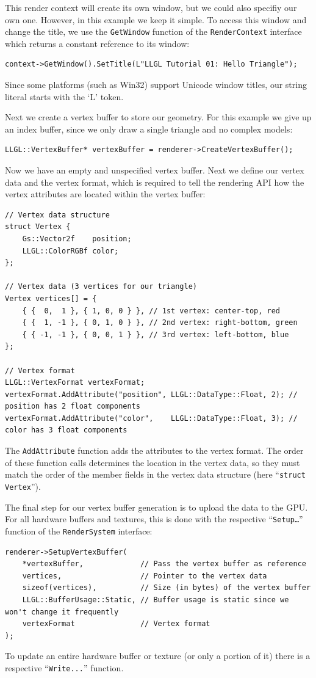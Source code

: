 \documentclass{article}
\begin{document}
This render context will create its own window, but we could also specifiy our own one.
However, in this example we keep it simple. To access this window and change the title,
we use the \texttt{GetWindow} function of the \texttt{RenderContext} interface
which returns a constant reference to its window:
\begin{lstlisting}
context->GetWindow().SetTitle(L"LLGL Tutorial 01: Hello Triangle");
\end{lstlisting}
Since some platforms (such as Win32) support Unicode window titles, our string literal starts with the `L' token.

\newpage
\noindent
Next we create a vertex buffer to store our geometry. For this example we give up an index buffer,
since we only draw a single triangle and no complex models:
\begin{lstlisting}
LLGL::VertexBuffer* vertexBuffer = renderer->CreateVertexBuffer();
\end{lstlisting}
Now we have an empty and unspecified vertex buffer. Next we define our vertex data and the vertex format,
which is required to tell the rendering API how the vertex attributes are located within the vertex buffer:
\begin{lstlisting}
// Vertex data structure
struct Vertex {
    Gs::Vector2f    position;
    LLGL::ColorRGBf color;
};

// Vertex data (3 vertices for our triangle)
Vertex vertices[] = {
    { {  0,  1 }, { 1, 0, 0 } }, // 1st vertex: center-top, red
    { {  1, -1 }, { 0, 1, 0 } }, // 2nd vertex: right-bottom, green
    { { -1, -1 }, { 0, 0, 1 } }, // 3rd vertex: left-bottom, blue
};

// Vertex format
LLGL::VertexFormat vertexFormat;
vertexFormat.AddAttribute("position", LLGL::DataType::Float, 2); // position has 2 float components
vertexFormat.AddAttribute("color",    LLGL::DataType::Float, 3); // color has 3 float components
\end{lstlisting}
The \texttt{AddAttribute} function adds the attributes to the vertex format.
The order of these function calls determines the location in the vertex data, so they must match
the order of the member fields in the vertex data structure (here ``\texttt{struct Vertex}'').

The final step for our vertex buffer generation is to upload the data to the GPU.
For all hardware buffers and textures, this is done with the respective ``\texttt{Setup\dots}'' function
of the \texttt{RenderSystem} interface:
\begin{lstlisting}
renderer->SetupVertexBuffer(
    *vertexBuffer,             // Pass the vertex buffer as reference
    vertices,                  // Pointer to the vertex data
    sizeof(vertices),          // Size (in bytes) of the vertex buffer
    LLGL::BufferUsage::Static, // Buffer usage is static since we won't change it frequently
    vertexFormat               // Vertex format
);
\end{lstlisting}
To update an entire hardware buffer or texture (or only a portion of it) there is a respective
``\texttt{Write...}'' function.
\end{document}
